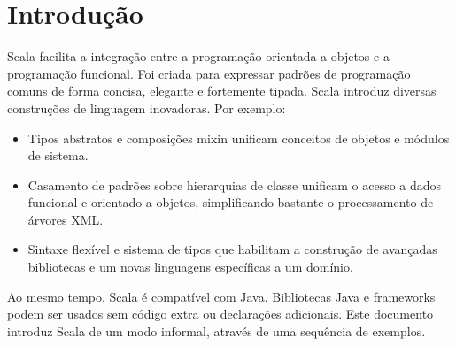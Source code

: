 \documentclass[a4paper,12pt,twoside,titlepage]{book}
\begin{document}
\frontmatter
\makedoctitle
\clearemptydoublepage
\tableofcontents
\mainmatter
\sloppy

\chapter{\label{chap:intro}Introdução}

Scala facilita a integração entre a  programação orientada a objetos e a programação funcional.
Foi criada para expressar padrões de programação comuns de forma concisa, elegante e fortemente tipada. 
Scala introduz diversas construções de linguagem inovadoras. Por exemplo:

\begin{itemize}
\item
Tipos abstratos e composições mixin unificam conceitos de objetos e módulos de sistema.

\item
Casamento de padrões sobre hierarquias de classe unificam o acesso a dados funcional e orientado a 
objetos, simplificando bastante o processamento de árvores XML.

\item
Sintaxe flexível e sistema de tipos que habilitam a construção de avançadas 
bibliotecas e um novas linguagens específicas a um domínio.
\end{itemize}


Ao mesmo tempo, Scala é compatível com Java. Bibliotecas Java e frameworks
podem ser usados sem código extra ou declarações adicionais.
Este documento introduz Scala de um modo informal, através de uma sequência
de exemplos.
\end{document}
